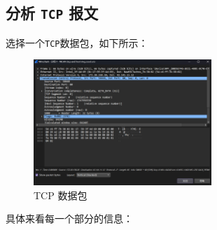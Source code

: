 \documentclass{article}
\begin{document}
	\subsection{分析 \texttt{TCP} 报文}
	
	选择一个\texttt{TCP}数据包，如下所示：
	
	\begin{figure}[H]
		\centering
		\includegraphics[width=0.6\textwidth]{images/4.TCP 数据包.png}
		\caption{TCP 数据包}
	\end{figure}
	
	具体来看每一个部分的信息：
	
\end{document}
